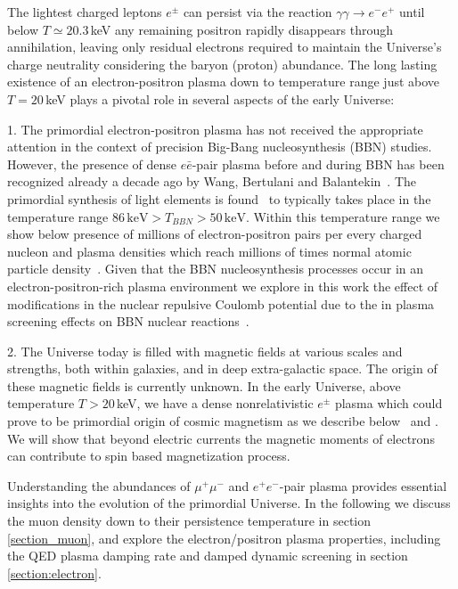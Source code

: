 The lightest charged leptons $e^\pm$ can persist via the reaction $\gamma\gamma\to e^-e^+$ until below $T\simeq 20.3$\,keV any remaining positron rapidly disappears through annihilation, leaving only residual electrons required to maintain the Universe's charge neutrality considering the baryon (proton) abundance. The long lasting existence of an electron-positron plasma down to temperature range just above $T=20$\,keV plays a pivotal role in several aspects of the early Universe: 

1. The primordial electron-positron plasma has not received the appropriate attention in the context of precision Big-Bang nucleosynthesis (BBN) studies. However, the presence of dense $e\bar e$-pair plasma before and during BBN has been recognized already a decade ago by Wang, Bertulani and Balantekin~\cite{Wang:2010px}. The primordial synthesis of light elements is found~\cite{Pitrou:2018cgg} to typically takes place in the temperature range $86\,\mathrm{keV}>T_{BBN}>50\,\mathrm{keV}$. Within this temperature range we show below presence of millions of electron-positron pairs per every charged nucleon and plasma densities which reach millions of times normal atomic particle density~\cite{Yang:2024ret,Grayson:2023flr}. Given that the BBN nucleosynthesis processes occur in an electron-positron-rich plasma environment we explore in this work the effect of modifications in the nuclear repulsive Coulomb potential due to the in plasma screening effects on BBN nuclear reactions~\cite{Grayson:2024okq,Grayson:2024uwg}.  

2. The Universe today is filled with magnetic fields at various scales and strengths, both within galaxies, and in deep extra-galactic space. The origin of these magnetic fields is currently unknown. In the early Universe, above temperature $T>20$\,keV, we have a dense nonrelativistic  $e^\pm$ plasma which could prove to be primordial origin of cosmic magnetism as we describe below~\cite{Steinmetz:2023ucp,Rafelski:2023emw,Steinmetz:2023nsc} and . We will show that beyond electric currents the magnetic moments of electrons can contribute to spin based magnetization process.

Understanding the abundances of $\mu^+\mu^-$ and $e^+e^-$-pair plasma provides essential insights into the evolution of the primordial Universe.  In the following we discuss the muon density down to their persistence temperature in section \ref{section_muon}, and explore the electron/positron plasma properties, including the QED plasma damping rate and damped dynamic screening in section \ref{section:electron}.

